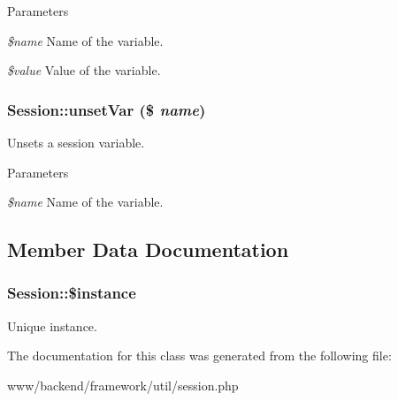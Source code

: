 \begin{DoxyParams}{Parameters}
\item[{\em \$name}]Name of the variable. \item[{\em \$value}]Value of the variable. \end{DoxyParams}
\hypertarget{classSession_ac0b791332d81ad7f542edeee935d0db4}{
\subsubsection[{unsetVar}]{\setlength{\rightskip}{0pt plus 5cm}Session::unsetVar (\$ {\em name})}}
\label{classSession_ac0b791332d81ad7f542edeee935d0db4}
Unsets a session variable.


\begin{DoxyParams}{Parameters}
\item[{\em \$name}]Name of the variable. \end{DoxyParams}


\subsection{Member Data Documentation}
\hypertarget{classSession_a86a6e52b2a48eeafaaff766db1973cef}{
\subsubsection[{\$instance}]{\setlength{\rightskip}{0pt plus 5cm}Session::\$instance}}
\label{classSession_a86a6e52b2a48eeafaaff766db1973cef}
Unique instance. 

The documentation for this class was generated from the following file:\begin{DoxyCompactItemize}
\item 
www/backend/framework/util/session.php\end{DoxyCompactItemize}
